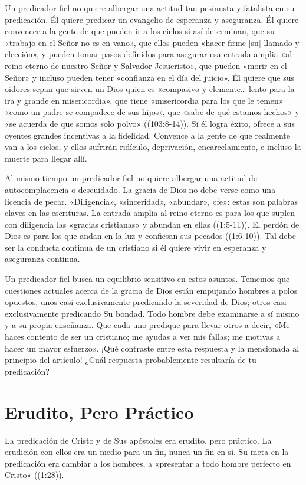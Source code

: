 \documentclass[12pt, twoside, openright]{book}
\begin{document}
Un predicador fiel no quiere albergar una actitud tan pesimista y fatalista en su predicación. Él quiere predicar un evangelio de esperanza y aseguranza. Él quiere convencer a la gente de que pueden ir a los cielos si así determinan, que su «trabajo en el Señor no es en vano», que ellos pueden «hacer firme [su] llamado y elección», y pueden tomar pasos definidos para asegurar esa entrada amplia «al reino eterno de nuestro Señor y Salvador Jesucristo», que pueden «morir en el Señor» y incluso pueden tener «confianza en el día del juicio». Él quiere que sus oidores sepan que sirven un Dios quien es «compasivo y clemente… lento para la ira y grande en misericordia», que tiene «misericordia para los que le temen» «como un padre se compadece de sus hijos», que «sabe de qué estamos hechos» y «se acuerda de que somos solo polvo» ((103:8-14)). Si él logra éxito, ofrece a sus oyentes grandes incentivas a la fidelidad. Convence a la gente de que realmente van a los cielos, y ellos sufrirán ridículo, deprivación, encarcelamiento, e incluso la muerte para llegar allí.

Al mismo tiempo un predicador fiel no quiere albergar una actitud de autocomplacencia o descuidado. La gracia de Dios no debe verse como una licencia de pecar. «Diligencia», «sinceridad», «abundar», «fe»: estas son palabras claves en las escrituras. La entrada amplia al reino eterno es para los que suplen con diligencia las «gracias cristianas» y abundan en ellas ((1:5-11)). El perdón de Dios es para los que andan en la luz y confiesan sus pecados ((1:6-10)). Tal debe ser la conducta continua de un cristiano si él quiere vivir en esperanza y aseguranza continua.

Un predicador fiel busca un equilibrio sensitivo en estos asuntos. Tememos que cuestiones actuales acerca de la gracia de Dios están empujando hombres a polos opuestos, unos casi exclusivamente predicando la severidad de Dios; otros casi exclusivamente predicando Su bondad. Todo hombre debe examinarse a sí mismo y a su propia enseñanza. Que cada uno predique para llevar otros a decir, «Me haces contento de ser un cristiano; me ayudas a ver mis fallas; me motivas a hacer un mayor esfuerzo». ¡Qué contraste entre esta respuesta y la mencionada al principio del artículo! ¿Cuál respuesta probablemente resultaría de tu predicación?

\section{Erudito, Pero Práctico}
La predicación de Cristo y de Sus apóstoles era erudito, pero práctico. La erudición con ellos era un medio para un fin, nunca un fin en sí. Su meta en la predicación era cambiar a los hombres, a «presentar a todo hombre perfecto en Cristo» ((1:28)).
\end{document}
